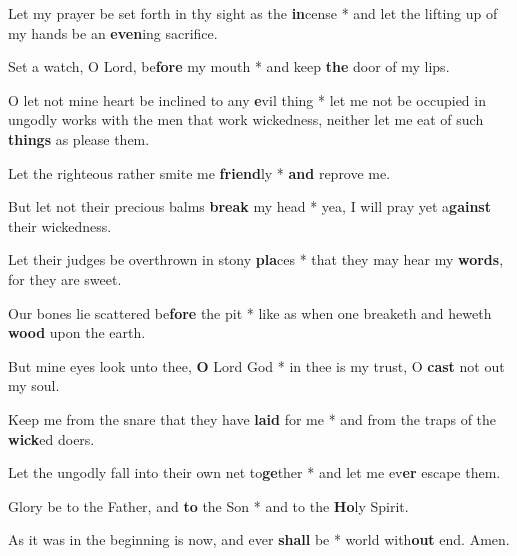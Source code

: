 \begin{multicols}{2}
	Let my prayer be set forth in thy sight as the \textbf{in}cense * and let the lifting up of my hands be an \textbf{even}ing sacrifice.
	
	Set a watch, O Lord, be\textbf{fore} my mouth * and keep \textbf{the} door of my lips.
	
	O let not mine heart be inclined to any \textbf{e}vil thing * let me not be occupied in ungodly works with the men that work wickedness, neither let me eat of such \textbf{things} as please them.
	
	Let the righteous rather smite me \textbf{friend}ly * \textbf{and} reprove me.
	
	But let not their precious balms \textbf{break} my head * yea, I will pray yet a\textbf{gainst} their wickedness.
	
	Let their judges be overthrown in stony \textbf{pla}ces * that they may hear my \textbf{words}, for they are sweet.
	
	Our bones lie scattered be\textbf{fore} the pit * like as when one breaketh and heweth \textbf{wood} upon the earth.
	
	But mine eyes look unto thee, \textbf{O} Lord God * in thee is my trust, O \textbf{cast} not out my soul.
	
	Keep me from the snare that they have \textbf{laid} for me * and from the traps of the \textbf{wick}ed doers.
	
	Let the ungodly fall into their own net to\textbf{ge}ther * and let me ev\textbf{er} escape them.
	
	Glory be to the Father, and \textbf{to} the Son * and to the \textbf{Ho}ly Spirit.
	
	As it was in the beginning is now, and ever \textbf{shall} be * world with\textbf{out} end. Amen.
\end{multicols}